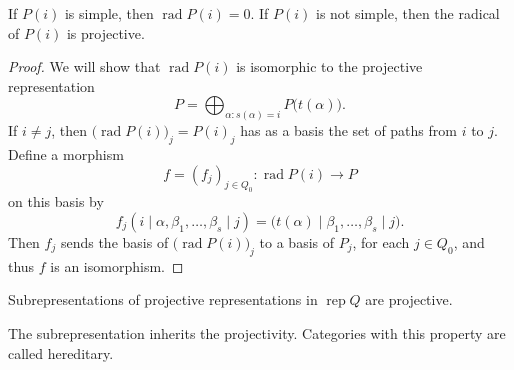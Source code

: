 \documentclass[11pt, a4paper]{report}
\begin{document}
        \begin{lemma}
            If $P(i)$ is simple, then $\operatorname{rad}P(i)=0$. If $P(i)$ is not simple, then the radical of $P(i)$ is projective.
        \end{lemma}

        \begin{proof}
        We will show that $\operatorname{rad}P(i)$ is isomorphic to the projective representation
        \[
        P=\bigoplus_{\alpha:s(\alpha)=i} P\bigl(t(\alpha)\bigr).
        \]
        If $i\neq j$, then $\bigl(\operatorname{rad}P(i)\bigr)_j=P(i)_j$ has as a basis the set of paths from $i$ to $j$. Define a morphism
        \[
        f=(f_j)_{j\in Q_0}:\operatorname{rad}P(i)\to P
        \]
        on this basis by
        \[
        f_j(i\mid \alpha,\beta_1,\ldots,\beta_s\mid j)=\bigl(t(\alpha)\mid \beta_1,\ldots,\beta_s\mid j\bigr).
        \]
        Then $f_j$ sends the basis of $\bigl(\operatorname{rad}P(i)\bigr)_j$ to a basis of $P_j$, for each $j\in Q_0$, and thus $f$ is an isomorphism.
        \end{proof}

        \begin{theorem}\label{thm:8.2.17}
            Subrepresentations of projective representations in $\operatorname{rep} Q$ are projective.
            \end{theorem}

            \begin{remark}
            The subrepresentation inherits the projectivity. Categories with this property are called hereditary.
            \end{remark}
\end{document}

